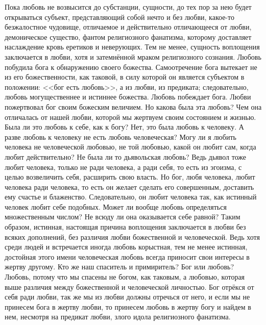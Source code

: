 \documentclass[12pt,oneside]{book}
\begin{document}
Пока любовь не возвысится до субстанции, сущности, до тех пор за нею будет открываться субъект, представляющий собой нечто и без любви, какое-то безжалостное чудовище, отличаемое и действительно отличающееся от любви, демоническое существо, фантом религиозного фанатизма, которому доставляет наслаждение кровь еретиков и неверующих. Тем не менее, сущность воплощения заключается в любви, хотя и затемнённой мраком религиозного сознания. Любовь побудила бога к обнаружению своего божества\ddag\let\svthefootnote\thefootnote\let\thefootnote\relax{}\let\thefootnote\svthefootnote. Самоотречение бога вытекает не из его божественности, как таковой, в силу которой он является субъектом в положении: <<бог есть любовь>>, а из любви, из предиката; следовательно, любовь могущественнее и истиннее божества. Любовь побеждает бога. Любви пожертвовал бог своим божеским величием. Но какова была эта любовь? Чем она отличалась от нашей любви, которой мы жертвуем своим состоянием и жизнью. Была ли это любовь к себе, как к богу? Нет, это была любовь к человеку. А разве любовь к человеку не есть любовь человеческая? Могу ли я любить человека не человеческой любовью, не той любовью, какой он любит сам, когда любит действительно? Не была ли то дьявольская любовь? Ведь дьявол тоже любит человека, только не ради человека, а ради себя, то есть из эгоизма, с целью возвеличить себя, расширить свою власть. Но бог, любя человека, любит человека ради человека, то есть он желает сделать его совершенным, доставить ему счастье и блаженство. Следовательно, он любит человека так, как истинный человек любит себе подобных. Может ли вообще любовь определяться множественным числом? Не всюду ли она оказывается себе равной? Таким образом, истинная, настоящая причина воплощения заключается в любви без всяких дополнений, без различия любви божественной и человеческой. Ведь хотя среди людей и встречается иногда любовь корыстная, тем не менее истинная, достойная этого имени человеческая любовь всегда приносит свои интересы в жертву другому. Кто же наш спаситель и примиритель? Бог или любовь? Любовь, потому что мы спасены не богом, как таковым, а любовью, которая выше различия между божественной и человеческой личностью. Бог отрёкся от себя ради любви, так же мы из любви должны отречься от него, и если мы не принесем бога в жертву любви, то принесем любовь в жертву богу и найдем в нем, несмотря на предикат любви, злого идола религиозного фанатизма.
\end{document}
